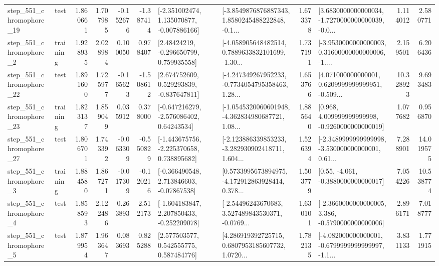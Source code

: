 \begin{tabular}{llrrrrllrlrr}
  step\_551\_chromophore\_19 &      test &      1.860661 &    1.707985 &     -0.152676 & -1.387414 &   [-2.351002474, 1.135070877, -0.007886166] &  [-3.8549876876887343, 1.8580245488222848, -0.1... &       1.673378 &  [3.6830000000000034, -1.7270000000000039, -0.0... &            1.114012 &          2.580771 \\
   step\_551\_chromophore\_2 &  training &      1.928935 &    2.028984 &      0.100050 &  0.978407 &     [2.48424219, -0.296650799, 0.759935558] &  [-4.058905648482514, 0.7889633832101699, -1.30... &       1.737191 &  [-3.9530000000000003, 0.31600000000000006, -1.... &            2.159501 &          6.206436 \\
  step\_551\_chromophore\_22 &      test &      1.891600 &    1.725977 &     -0.165623 & -1.508612 &    [2.674752609, 0.529293839, -0.837647811] &  [-4.247349267952233, -0.7734054795358463, 1.28... &       1.653766 &  [4.071000000000001, 0.6209999999999951, -0.509... &           10.328923 &          9.693483 \\
  step\_551\_chromophore\_23 &  training &      1.823137 &    1.859049 &      0.035912 &  0.378000 &    [-0.647216279, -2.576086402, 0.64243534] &  [-1.0545320060601948, -4.362834980687721, 1.08... &       1.885640 &    [0.968, 4.009999999999998, -0.9260000000000019] &            1.077682 &          0.956870 \\
  step\_551\_chromophore\_27 &      test &      1.806701 &    1.743392 &     -0.063309 & -0.550829 &   [-1.443675756, -2.225370658, 0.738895682] &  [-2.123886339853233, -3.282930902418711, 1.604... &       1.526394 &  [-2.3489999999999998, -3.530000000000001, 0.61... &            7.288901 &         14.019575 \\
   step\_551\_chromophore\_3 &  training &      1.884580 &    1.867271 &     -0.017309 & -0.120216 &    [-0.366490548, 2.713846603, -0.07867538] &  [0.5733995673894975, -4.172912863928414, 0.378... &       1.503779 &                [0.55, -4.061, -0.3880000000000017] &            7.054226 &         10.538774 \\
   step\_551\_chromophore\_4 &      test &      1.858593 &    2.122486 &      0.263893 &  2.512173 &   [-1.604183847, 2.207850433, -0.252209078] &  [-2.54496243670683, 3.527489843530371, -0.0769... &       1.630101 &  [-2.3660000000000005, 3.386, -0.5790000000000006] &            2.896171 &          7.018777 \\
   step\_551\_chromophore\_5 &      test &      1.879954 &    1.963647 &      0.083693 &  0.825288 &     [2.577503577, 0.542555775, 0.587484776] &  [4.286919392725715, 0.6807953185607732, 1.0720... &       1.782135 &  [-4.082000000000001, -0.6799999999999997, -1.1... &            3.831133 &          1.771915 \\

\end{tabular}
